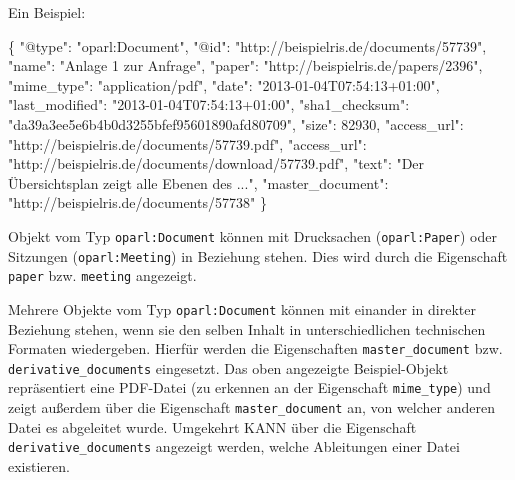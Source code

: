 \documentclass[,a4paper]{article}
\newenvironment{Shaded}{}{}
\newcommand{\DataTypeTok}[1]{\textcolor[rgb]{0.56,0.13,0.00}{{#1}}}
\newcommand{\DecValTok}[1]{\textcolor[rgb]{0.25,0.63,0.44}{{#1}}}
\newcommand{\StringTok}[1]{\textcolor[rgb]{0.25,0.44,0.63}{{#1}}}
\newcommand{\NormalTok}[1]{{#1}}
\begin{document}
Ein Beispiel:

\begin{Shaded}
\begin{Highlighting}[]
\NormalTok{\{}
    \DataTypeTok{"@type"}\NormalTok{: }\StringTok{"oparl:Document"}\NormalTok{,}
    \DataTypeTok{"@id"}\NormalTok{: }\StringTok{"http://beispielris.de/documents/57739"}\NormalTok{,}
    \DataTypeTok{"name"}\NormalTok{: }\StringTok{"Anlage 1 zur Anfrage"}\NormalTok{,}
    \DataTypeTok{"paper"}\NormalTok{: }\StringTok{"http://beispielris.de/papers/2396"}\NormalTok{,}
    \DataTypeTok{"mime_type"}\NormalTok{: }\StringTok{"application/pdf"}\NormalTok{,}
    \DataTypeTok{"date"}\NormalTok{: }\StringTok{"2013-01-04T07:54:13+01:00"}\NormalTok{,}
    \DataTypeTok{"last_modified"}\NormalTok{: }\StringTok{"2013-01-04T07:54:13+01:00"}\NormalTok{,}
    \DataTypeTok{"sha1_checksum"}\NormalTok{: }\StringTok{"da39a3ee5e6b4b0d3255bfef95601890afd80709"}\NormalTok{,}
    \DataTypeTok{"size"}\NormalTok{: }\DecValTok{82930}\NormalTok{,}
    \DataTypeTok{"access_url"}\NormalTok{: }\StringTok{"http://beispielris.de/documents/57739.pdf"}\NormalTok{,}
    \DataTypeTok{"access_url"}\NormalTok{: }\StringTok{"http://beispielris.de/documents/download/57739.pdf"}\NormalTok{,}
    \DataTypeTok{"text"}\NormalTok{: }\StringTok{"Der Übersichtsplan zeigt alle Ebenen des ..."}\NormalTok{,}
    \DataTypeTok{"master_document"}\NormalTok{: }\StringTok{"http://beispielris.de/documents/57738"}
\NormalTok{\}}
\end{Highlighting}
\end{Shaded}

Objekt vom Typ \texttt{oparl:Document} können mit Drucksachen
(\texttt{oparl:Paper}) oder Sitzungen (\texttt{oparl:Meeting}) in
Beziehung stehen. Dies wird durch die Eigenschaft \texttt{paper} bzw.
\texttt{meeting} angezeigt.

Mehrere Objekte vom Typ \texttt{oparl:Document} können mit einander in
direkter Beziehung stehen, wenn sie den selben Inhalt in
unterschiedlichen technischen Formaten wiedergeben. Hierfür werden die
Eigenschaften \texttt{master\_document} bzw.
\texttt{derivative\_documents} eingesetzt. Das oben angezeigte
Beispiel-Objekt repräsentiert eine PDF-Datei (zu erkennen an der
Eigenschaft \texttt{mime\_type}) und zeigt außerdem über die Eigenschaft
\texttt{master\_document} an, von welcher anderen Datei es abgeleitet
wurde. Umgekehrt KANN über die Eigenschaft
\texttt{derivative\_documents} angezeigt werden, welche Ableitungen
einer Datei existieren.
\end{document}
